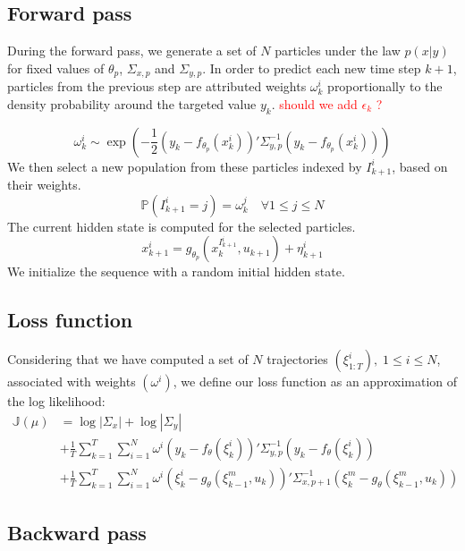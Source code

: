 \documentclass[10pt,a4paper]{report}
\begin{document}
\subsection{Forward pass}
During the forward pass, we generate a set of $N$ particles under the law $p(x|y)$ for fixed values of $\theta_p$, $\Sigma_{x, p}$ and $\Sigma_{y, p}$.
In order to predict each new time step $k+1$, particles from the previous step are attributed weights $\omega_k^i$ proportionally to the density probability around the targeted value $y_k$.
\textcolor{red}{should we add $\epsilon_k$ ?}

$$\omega_k^i \sim \exp(-\frac{1}{2}(y_k - f_{\theta_p}(x_k^i))'\Sigma^{-1}_{y, p}(y_k - f_{\theta_p}(x_k^i)))$$
We then select a new population from these particles indexed by $I_{k+1}^i$, based on their weights.
$$\mathbb{P}(I_{k+1}^i=j) = \omega_k^j \quad \forall 1 \leq j \leq N$$
The current hidden state is computed for the selected particles.
$$x^i_{k+1} = g_{\theta_p}(x_k^{I_{k+1}^i}, u_{k+1}) + \eta^i_{k+1}$$
We initialize the sequence with a random initial hidden state.

\subsection{Loss function}
Considering that we have computed a set of $N$ trajectories $(\xi^i_{1:T}),\;1 \leq i \leq N$, associated with weights $(\omega^i)$, we define our loss function as an approximation of the log likelihood:
\begin{align*}
        \mathbb{J}(\mu) & = \log |\Sigma_x| + \log |\Sigma_y|                                                                                                               \\
                        & + \frac{1}{T}\sum_{k=1}^T \sum_{i=1}^N \omega^i (y_k - f_\theta(\xi_k^i))' \Sigma_{y, p}^{-1} (y_k - f_\theta(\xi_k^i))                           \\
                        & + \frac{1}{T}\sum_{k=1}^T \sum_{i=1}^N \omega^i (\xi_k^i - g_\theta(\xi_{k-1}^m, u_k))'\Sigma_{x, p+1}^{-1}(\xi_k^m - g_\theta(\xi_{k-1}^m, u_k))
\end{align*}

\subsection{Backward pass}
\end{document}
